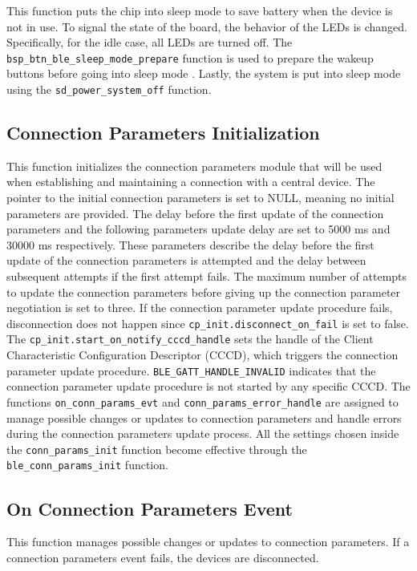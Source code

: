 \documentclass{Configuration_Files/PoliMi3i_thesis}
\begin{document}
This function puts the chip into sleep mode to save battery when the device is not in use. To signal the state of the board, the behavior of the LEDs is changed. Specifically, for the idle case, all LEDs are turned off. The \texttt{bsp\_btn\_ble\_sleep\_mode\_prepare} function is used to prepare the wakeup buttons before going into sleep mode \cite{nordic_semi}. Lastly, the system is put into sleep mode using the \texttt{sd\_power\_system\_off} function.

\subsection*{Connection Parameters Initialization}

This function initializes the connection parameters module that will be used when establishing and maintaining a connection with a central device. The pointer to the initial connection parameters is set to NULL, meaning no initial parameters are provided. The delay before the first update of the connection parameters and the following parameters update delay are set to 5000 ms and 30000 ms respectively. These parameters describe the delay before the first update of the connection parameters is attempted and the delay between subsequent attempts if the first attempt fails. The maximum number of attempts to update the connection parameters before giving up the connection parameter negotiation is set to three. If the connection parameter update procedure fails, disconnection does not happen since \texttt{cp\_init.disconnect\_on\_fail} is set to false. The \texttt{cp\_init.start\_on\_notify\_cccd\_handle} sets the handle of the Client Characteristic Configuration Descriptor (CCCD), which triggers the connection parameter update procedure. \texttt{BLE\_GATT\_HANDLE\_INVALID} indicates that the connection parameter update procedure is not started by any specific CCCD. The functions \texttt{on\_conn\_params\_evt} and \texttt{conn\_params\_error\_handle} are assigned to manage possible changes or updates to connection parameters and handle errors during the connection parameters update process. All the settings chosen inside the \texttt{conn\_params\_init} function become effective through the \texttt{ble\_conn\_params\_init} function.

\subsection*{On Connection Parameters Event}

This function manages possible changes or updates to connection parameters. If a connection parameters event fails, the devices are disconnected.
\end{document}
